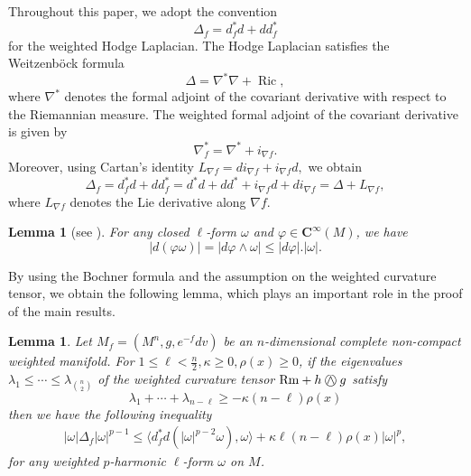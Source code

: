 \documentclass[leqno,12pt]{article} %
\theoremstyle{plain} %
\newtheorem{lemma}[theorem]{\indent\sc Lemma}
\theoremstyle{definition} %
\numberwithin{equation}{section}
\newcommand{\KN}{\mathbin{\bigcirc\mspace{-15mu}\wedge\mspace{3mu}}}
\begin{document}
Throughout this paper, we adopt the convention
\[
\Delta_f=d_f^*d+dd_f^*
\]
for the weighted Hodge Laplacian. 
The Hodge Laplacian satisfies the Weitzenb\"ock formula
\begin{equation}\label{eq:HodgeLaplacian}
    \Delta=\nabla^*\nabla+\operatorname{Ric},
\end{equation}
where $\nabla^*$ denotes the formal adjoint of the covariant derivative with respect to the Riemannian measure. The weighted formal adjoint of the covariant derivative is given by
\[
\nabla_f^*=\nabla^*+i_{\nabla f}.
\]
Moreover, using Cartan's identity
$L_{\nabla f}=di_{\nabla f}+i_{\nabla f}d,$
we obtain
\begin{equation}\label{eq:weighted_hodge}
\Delta_f
=d_f^*d+dd_f^*  
=d^*d+dd^*+i_{\nabla f}d+di_{\nabla f} 
=\Delta+L_{\nabla f},
\end{equation}
where $L_{\nabla f}$ denotes the Lie derivative along $\nabla f$.

\begin{lemma} [see \cite{DS19}]  \label{d}
	For any closed $\ell$-form $\omega$ and $\varphi \in \mathbf{C} ^\infty (M)$, we have
	$$|d(\varphi \omega)|=|d \varphi \wedge \omega| \le |d \varphi|. |\omega|.$$	
\end{lemma}



By using the Bochner formula and the assumption on the weighted curvature tensor, we obtain the following lemma, which plays an important role in the proof of the main results.
\begin{lemma}\label{Boc}
	Let $M_f=(M^n,g,e^{-f}dv)$ be an $n$-dimensional complete non-compact weighted manifold. For $1\le \ell <\frac{n}{2}, \kappa \ge 0, \rho(x)\ge 0$, if the eigenvalues $\lambda_1\le \cdots \le \lambda_{\binom{n}{2}}$  
	of the weighted curvature tensor
	$\mathrm{Rm}+h \KN g$
	satisfy $$\lambda_1+\cdots+\lambda_{n-\ell}\ge -\kappa(n-\ell)\rho(x)	$$
	then we have the following inequality
	\begin{align} \label{BocF}
	|\omega| \Delta_f |\omega|^{p-1} \le \langle d^*_f d (|\omega|^{p-2}\omega), \omega\rangle+\kappa \ell (n-\ell) \rho(x)|\omega|^p,
\end{align}
	for any weighted $p$-harmonic $\ell$-form $\omega$ on $M$.
\end{lemma}
\end{document}
